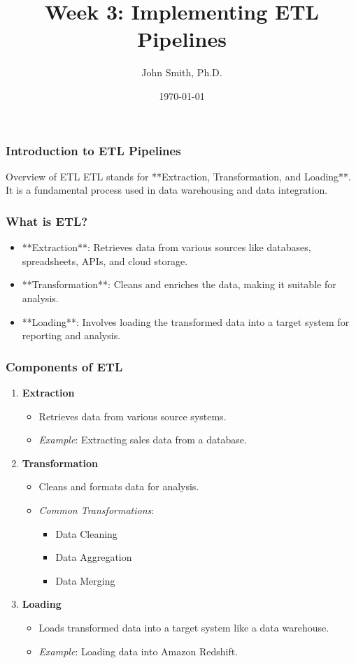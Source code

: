 \documentclass[aspectratio=169]{beamer}
\title[Week 3: Implementing ETL Pipelines]{Week 3: Implementing ETL Pipelines}
\author[J. Smith]{John Smith, Ph.D.}
\institute[University Name]{
  Department of Computer Science\\
  University Name\\
  \vspace{0.3cm}
  Email: email@university.edu\\
  Website: www.university.edu
}
\date{\today}
\begin{document}
\frame{\titlepage}

\begin{frame}[fragile]
    \frametitle{Introduction to ETL Pipelines}
    \begin{block}{Overview of ETL}
        ETL stands for **Extraction, Transformation, and Loading**. It is a fundamental process used in data warehousing and data integration.
    \end{block}
\end{frame}

\begin{frame}[fragile]
    \frametitle{What is ETL?}
    \begin{itemize}
        \item **Extraction**: Retrieves data from various sources like databases, spreadsheets, APIs, and cloud storage.
        \item **Transformation**: Cleans and enriches the data, making it suitable for analysis.
        \item **Loading**: Involves loading the transformed data into a target system for reporting and analysis.
    \end{itemize}
\end{frame}

\begin{frame}[fragile]
    \frametitle{Components of ETL}
    \begin{enumerate}
        \item \textbf{Extraction}
            \begin{itemize}
                \item Retrieves data from various source systems.
                \item \textit{Example}: Extracting sales data from a database.
            \end{itemize}
        \item \textbf{Transformation}
            \begin{itemize}
                \item Cleans and formats data for analysis.
                \item \textit{Common Transformations}:
                \begin{itemize}
                    \item Data Cleaning
                    \item Data Aggregation
                    \item Data Merging
                \end{itemize}
            \end{itemize}
        \item \textbf{Loading}
            \begin{itemize}
                \item Loads transformed data into a target system like a data warehouse.
                \item \textit{Example}: Loading data into Amazon Redshift.
            \end{itemize}
    \end{enumerate}
\end{frame}
\end{document}
